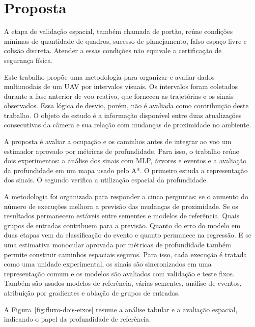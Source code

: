 \chapter{Proposta}

A etapa de validação espacial, também chamada de portão, reúne condições mínimas de quantidade de quadros, sucesso de planejamento, falso espaço livre e colisão discreta. Atender a essas condições não equivale a certificação de segurança física.
\label{cap:proposta}



Este trabalho propõe uma metodologia para organizar e avaliar dados multimodais de um UAV por intervalos visuais. Os intervalos foram coletados durante a fase anterior de voo reativo, que forneceu as trajetórias e os sinais observados. Essa lógica de desvio, porém, não é avaliada como contribuição deste trabalho. O objeto de estudo é a informação disponível entre duas atualizações consecutivas da câmera e sua relação com mudanças de proximidade no ambiente.

A proposta é avaliar a ocupação e os caminhos antes de integrar ao voo um estimador aprovado por métricas de profundidade. Para isso, o trabalho reúne dois experimentos: a análise dos sinais com MLP, árvores e eventos e a avaliação da profundidade em um mapa usado pelo A*. O primeiro estuda a representação dos sinais. O segundo verifica a utilização espacial da profundidade.

A metodologia foi organizada para responder a cinco perguntas: se o aumento do número de execuções melhora a previsão das mudanças de proximidade. Se os resultados permanecem estáveis entre sementes e modelos de referência. Quais grupos de entradas contribuem para a previsão. Quanto do erro do modelo em duas etapas vem da classificação do evento e quanto permanece na regressão. E se uma estimativa monocular aprovada por métricas de profundidade também permite construir caminhos espaciais seguros. Para isso, cada execução é tratada como uma unidade experimental, os sinais são sincronizados em uma representação comum e os modelos são avaliados com validação e teste fixos. Também são usados modelos de referência, várias sementes, análise de eventos, atribuição por gradientes e ablação de grupos de entradas.

A Figura~\ref{fig:fluxo-dois-eixos} resume a análise tabular e a avaliação espacial, indicando o papel da profundidade de referência.

